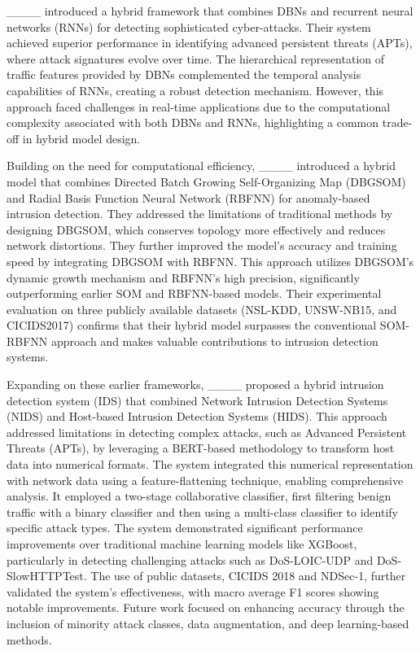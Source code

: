 ____ introduced a hybrid framework that combines DBNs and recurrent neural networks (RNNs) for detecting sophisticated cyber-attacks. Their system achieved superior performance in identifying advanced persistent threats (APTs), where attack signatures evolve over time. The hierarchical representation of traffic features provided by DBNs complemented the temporal analysis capabilities of RNNs, creating a robust detection mechanism. However, this approach faced challenges in real-time applications due to the computational complexity associated with both DBNs and RNNs, highlighting a common trade-off in hybrid model design.

Building on the need for computational efficiency, ____ introduced a hybrid model that combines Directed Batch Growing Self-Organizing Map (DBGSOM) and Radial Basis Function Neural Network (RBFNN) for anomaly-based intrusion detection. They addressed the limitations of traditional methods by designing DBGSOM, which conserves topology more effectively and reduces network distortions. They further improved the model's accuracy and training speed by integrating DBGSOM with RBFNN. This approach utilizes DBGSOM's dynamic growth mechanism and RBFNN's high precision, significantly outperforming earlier SOM and RBFNN-based models. Their experimental evaluation on three publicly available datasets (NSL-KDD, UNSW-NB15, and CICIDS2017) confirms that their hybrid model surpasses the conventional SOM-RBFNN approach and makes valuable contributions to intrusion detection systems.

Expanding on these earlier frameworks, ____ proposed a hybrid intrusion detection system (IDS) that combined Network Intrusion Detection Systems (NIDS) and Host-based Intrusion Detection Systems (HIDS). This approach addressed limitations in detecting complex attacks, such as Advanced Persistent Threats (APTs), by leveraging a BERT-based methodology to transform host data into numerical formats. The system integrated this numerical representation with network data using a feature-flattening technique, enabling comprehensive analysis. It employed a two-stage collaborative classifier, first filtering benign traffic with a binary classifier and then using a multi-class classifier to identify specific attack types. The system demonstrated significant performance improvements over traditional machine learning models like XGBoost, particularly in detecting challenging attacks such as DoS-LOIC-UDP and DoS-SlowHTTPTest. The use of public datasets, CICIDS 2018 and NDSec-1, further validated the system's effectiveness, with macro average F1 scores showing notable improvements. Future work focused on enhancing accuracy through the inclusion of minority attack classes, data augmentation, and deep learning-based methods.

